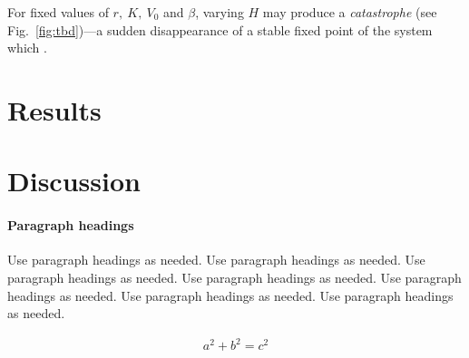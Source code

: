 \documentclass[smallextended]{svjour3}       %
\begin{document}
For fixed values of $r,\ K,\ V_0$ and $\beta$, varying $H$ may produce a \emph{catastrophe} (see Fig.~\ref{fig:tbd})---a sudden disappearance of a stable fixed point of the system which . 

\hypertarget{sec:5}{%
\section{Results}\label{sec:results}}

\hypertarget{sec:6}{%
\section{Discussion}\label{sec:discussion}}




\hypertarget{paragraph-headings}{%
\paragraph{Paragraph headings}\label{paragraph-headings}}

Use paragraph headings as needed. 
Use paragraph headings as needed. 
Use paragraph headings as needed. 
Use paragraph headings as needed. 
Use paragraph headings as needed. 
Use paragraph headings as needed. 
Use paragraph headings as needed. 

\begin{align}
a^2+b^2=c^2
\end{align}




\end{document}

